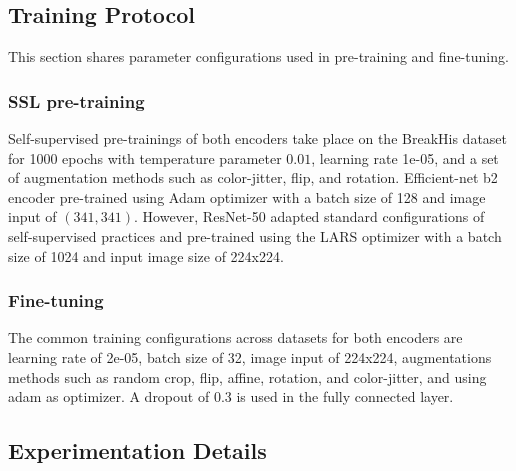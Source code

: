 \documentclass[conference]{IEEEtran}
\begin{document}
\subsection{Training Protocol}
This section shares parameter configurations used in pre-training and fine-tuning. 
\subsubsection{SSL pre-training}
Self-supervised pre-trainings of both encoders take place on the BreakHis dataset for 1000 epochs with temperature parameter $0.01$, learning rate 1e-05, and a set of augmentation methods such as color-jitter, flip, and rotation. Efficient-net b2 encoder pre-trained using Adam optimizer with a batch size of 128 and image input of $(341, 341)$. However, ResNet-50 adapted standard configurations of self-supervised practices and pre-trained using the LARS optimizer with a batch size of 1024 and input image size of 224x224.
\subsubsection{Fine-tuning}
The common training configurations across datasets for both encoders are learning rate of 2e-05, batch size of 32, image input of 224x224, augmentations methods such as random crop, flip, affine, rotation, and color-jitter, and using adam as optimizer. A dropout of 0.3 is used in the fully connected layer.
\subsection{Experimentation Details}
\end{document}
